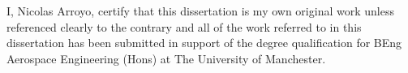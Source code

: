 

I, Nicolas Arroyo, certify that this dissertation is my own original work unless referenced clearly to the contrary and all of the work referred to in this dissertation has been submitted in support of the degree qualification for BEng Aerospace Engineering (Hons) at The University of Manchester.